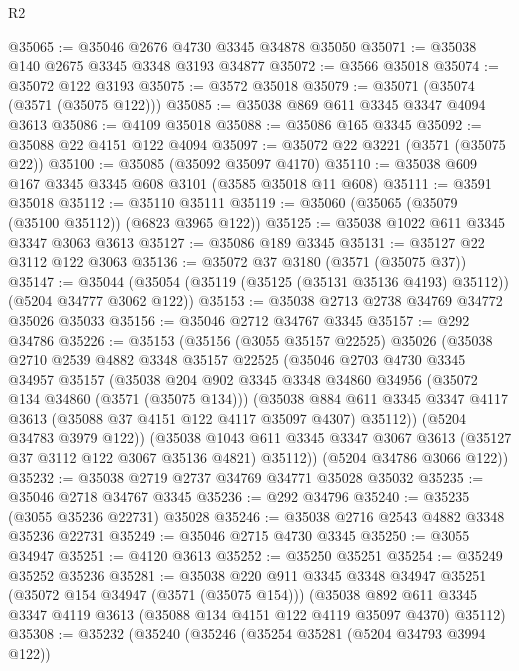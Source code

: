 \begin{lexlean}{R2}
\begin{coremodule}
@35065 := @35046 @2676 @4730 @3345 @34878 @35050
@35071 := @35038 @140 @2675 @3345 @3348 @3193 @34877
@35072 := @3566 @35018
@35074 := @35072 @122 @3193
@35075 := @3572 @35018
@35079 := @35071 (@35074 (@3571 (@35075 @122)))
@35085 := @35038 @869 @611 @3345 @3347 @4094 @3613
@35086 := @4109 @35018
@35088 := @35086 @165 @3345
@35092 := @35088 @22 @4151 @122 @4094
@35097 := @35072 @22 @3221 (@3571 (@35075 @22))
@35100 := @35085 (@35092 @35097 @4170)
@35110 := @35038 @609 @167 @3345 @3345 @608 @3101 (@3585 @35018 @11 @608)
@35111 := @3591 @35018
@35112 := @35110 @35111
@35119 := @35060 (@35065 (@35079 (@35100 @35112)) (@6823 @3965 @122))
@35125 := @35038 @1022 @611 @3345 @3347 @3063 @3613
@35127 := @35086 @189 @3345
@35131 := @35127 @22 @3112 @122 @3063
@35136 := @35072 @37 @3180 (@3571 (@35075 @37))
@35147 := @35044 (@35054 (@35119 (@35125 (@35131 @35136 @4193) @35112)) (@5204 @34777 @3062 @122))
@35153 := @35038 @2713 @2738 @34769 @34772 @35026 @35033
@35156 := @35046 @2712 @34767 @3345
@35157 := @292 @34786
@35226 := @35153
    (@35156
      (@3055 @35157 @22525)
      @35026
      (@35038
        @2710
        @2539
        @4882
        @3348
        @35157
        @22525
        (@35046
          @2703
          @4730
          @3345
          @34957
          @35157
          (@35038
            @204
            @902
            @3345
            @3348
            @34860
            @34956
            (@35072 @134 @34860 (@3571 (@35075 @134)))
            (@35038
              @884
              @611
              @3345
              @3347
              @4117
              @3613
              (@35088 @37 @4151 @122 @4117 @35097 @4307)
              @35112))
          (@5204 @34783 @3979 @122))
        (@35038
          @1043
          @611
          @3345
          @3347
          @3067
          @3613
          (@35127 @37 @3112 @122 @3067 @35136 @4821)
          @35112))
      (@5204 @34786 @3066 @122))
@35232 := @35038 @2719 @2737 @34769 @34771 @35028 @35032
@35235 := @35046 @2718 @34767 @3345
@35236 := @292 @34796
@35240 := @35235 (@3055 @35236 @22731) @35028
@35246 := @35038 @2716 @2543 @4882 @3348 @35236 @22731
@35249 := @35046 @2715 @4730 @3345
@35250 := @3055 @34947
@35251 := @4120 @3613
@35252 := @35250 @35251
@35254 := @35249 @35252 @35236
@35281 := @35038
    @220
    @911
    @3345
    @3348
    @34947
    @35251
    (@35072 @154 @34947 (@3571 (@35075 @154)))
    (@35038 @892 @611 @3345 @3347 @4119 @3613 (@35088 @134 @4151 @122 @4119 @35097 @4370) @35112)
@35308 := @35232
    (@35240
      (@35246
        (@35254 @35281 (@5204 @34793 @3994 @122))

\end{coremodule}
\end{lexlean}
